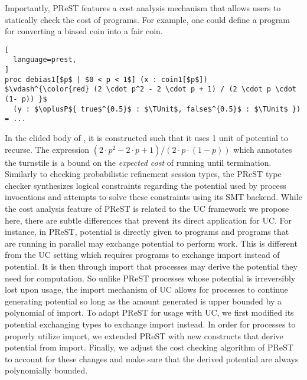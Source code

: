 Importantly, PReST features a cost analysis mechanism that allows users to
statically check the cost of programs. For example, one could define a 
 program for converting a biased coin into a fair coin.
\begin{lstlisting}[
  language=prest,
]
proc debias1[$p$ | $0 < p < 1$] (x : coin1[$p$])
$\vdash^{\color{red} (2 \cdot p^2 - 2 \cdot p + 1) / (2 \cdot p \cdot (1- p)) }$ 
  (y : $\oplusP${ true$^{0.5}$ : $\TUnit$, false$^{0.5}$ : $\TUnit$ }) = ...
\end{lstlisting}
In the elided body of , it is constructed such that it uses 1 unit 
of potential to recurse. The expression $(2 \cdot p^2 - 2 \cdot p + 1) / (2 \cdot p \cdot (1- p))$
which annotates the turnstile is a bound on the \emph{expected cost} of running
 until termination. Similarly to checking probabilistic refinement 
session types, the PReST type checker synthesizes logical constraints regarding
the potential used by process invocations and attempts to solve these
constraints using its SMT backend. While the cost analysis feature of PReST is
related to the UC framework we propose here, there are subtle differences that
prevent its direct application for UC. For instance, in PReST, potential is
directly given to programs and programs that are running in parallel may
exchange potential to perform work. This is different from the UC setting which
requires programs to exchange import instead of potential. It is then through
import that processes may derive the potential they need for computation.
So unlike PReST processes whose potential is irreversibly lost upon usage, the
import mechanism of UC allows for processes to continue generating potential so
long as the amount generated is upper bounded by a polynomial of import.
To adapt PReST for usage with UC, we first modified its potential exchanging types to
exchange import instead. In order for processes to properly utilize import, we 
extended PReST with new constructs that derive potential from import. Finally,  
we adjust the cost checking algorithm of PReST to account for these changes and
make sure that the derived potential are always polynomially bounded.
